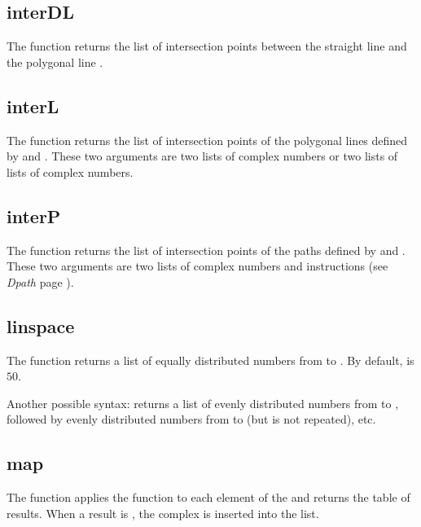 \subsection{interDL}

The function  returns the list of intersection points between the straight line  and the polygonal line .

\subsection{interL}

The function  returns the list of intersection points of the polygonal lines defined by  and . These two arguments are two lists of complex numbers or two lists of lists of complex numbers.

\subsection{interP}

The function  returns the list of intersection points of the paths defined by  and . These two arguments are two lists of complex numbers and instructions (see \emph{Dpath} page \pageref{Dpath}).


\subsection{linspace}

The function  returns a list of  equally distributed numbers from  to . By default,  is $50$.

Another possible syntax:  returns a list of  evenly distributed numbers from  to , followed by  evenly distributed numbers from  to  (but  is not repeated), etc.

\subsection{map}

The function  applies the function  to each element of the  and returns the table of results. When a result is \nil, the complex  is inserted into the list.

